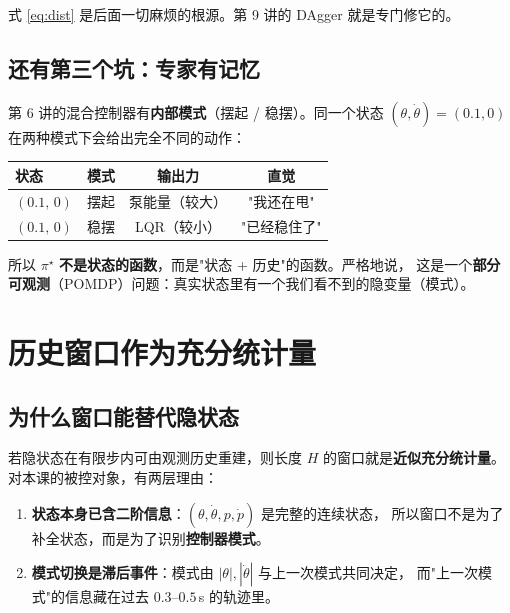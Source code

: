 式 \eqref{eq:dist} 是后面一切麻烦的根源。第 9 讲的 DAgger 就是专门修它的。

\subsection{还有第三个坑：专家有记忆}

第 6 讲的混合控制器有\textbf{内部模式}（摆起 / 稳摆）。同一个状态
$(\theta,\dot\theta)=(0.1,0)$ 在两种模式下会给出完全不同的动作：

\begin{center}
\small
\begin{tabular}{@{}lccc@{}}
\toprule
状态 & 模式 & 输出力 & 直觉 \\
\midrule
$(0.1,\,0)$ & 摆起 & 泵能量（较大） & "我还在甩" \\
$(0.1,\,0)$ & 稳摆 & LQR（较小） & "已经稳住了" \\
\bottomrule
\end{tabular}
\end{center}

所以 $\pi^\star$ \textbf{不是状态的函数}，而是"状态 + 历史"的函数。严格地说，
这是一个\textbf{部分可观测}（POMDP）问题：真实状态里有一个我们看不到的隐变量（模式）。


\section{历史窗口作为充分统计量}

\subsection{为什么窗口能替代隐状态}

若隐状态在有限步内可由观测历史重建，则长度 $H$ 的窗口就是\textbf{近似充分统计量}。
对本课的被控对象，有两层理由：

\begin{enumerate}[leftmargin=2em,itemsep=2pt]
  \item \textbf{状态本身已含二阶信息}：$(\theta,\dot\theta,p,\dot p)$ 是完整的连续状态，
        所以窗口不是为了补全状态，而是为了识别\textbf{控制器模式}。
  \item \textbf{模式切换是滞后事件}：模式由 $|\theta|,|\dot\theta|$ 与上一次模式共同决定，
        而"上一次模式"的信息藏在过去 $0.3$--$0.5$\,s 的轨迹里。
\end{enumerate}

